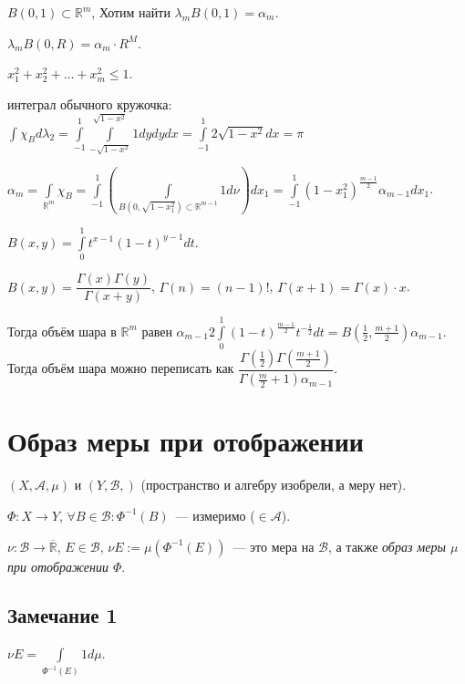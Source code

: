 \documentclass{article}
\begin{document}
        $B(0, 1) \subset \mathbb{R}^m$, Хотим найти $\lambda_m B(0, 1) = \alpha_m$.
    
        $\lambda_m B(0, R) = \alpha_m \cdot R^M$.
    
        $x_1^2 + x_2^2 + \ldots + x_m^2 \leqslant 1$.
    
        интеграл обычного кружочка: $\int \chi_B d \lambda_2 = \int\limits^1_{-1} \int\limits^{\sqrt{1 - x^2}}_{-\sqrt{1 - x^2}} 1 dy dy dx = \int\limits^1_{-1} 2 \sqrt{1 - x^2} dx = \pi$
    
        $\alpha_m = \int\limits_{\mathbb{R}^m} \chi_B = \int\limits^1_{-1} \left( \int\limits_{B(0, \sqrt{1 - x_1^2}) \subset \mathbb{R}^{m -1}} 1 d \nu \right) dx_1 = \int\limits^1_{-1} (1 - x_1^2)^{\frac{m - 1}{2}} \alpha_{m - 1} d x_1$.
    
        $B(x, y) = \int\limits^1_0 t^{x - 1} (1 - t)^{y - 1} dt$.
    
        $B(x, y) = \dfrac{\Gamma(x) \Gamma(y)}{\Gamma(x + y)}$, $\Gamma(n) = (n - 1)!$, $\Gamma(x + 1) = \Gamma(x) \cdot x$.
    
        Тогда объём шара в $\mathbb{R}^m$ равен $\alpha_{m - 1} 2 \int\limits^1_0 (1 - t)^{\frac{m - 1}{2}} t^{-\frac{1}{2}} dt = B(\frac{1}{2}, \frac{m + 1}{2}) \alpha_{m - 1}$. Тогда объём шара можно переписать как $\dfrac{\Gamma (\frac{1}{2}) \Gamma (\frac{m + 1}{2})}{\Gamma (\frac{m}{2} + 1) \alpha_{m - 1}}$.
    
\newpage

    \section{Образ меры при отображении}
    
        $(X, \mathcal{A}, \mu)$ и $(Y, \mathcal{B}, )$ (пространство и алгебру изобрели, а меру нет).
    
        $\Phi : X \rightarrow Y$, $\forall B \in \mathcal{B} : \Phi^{-1}(B)$~--- измеримо ($\in \mathcal{A}$).
    
        $\nu : \mathcal{B} \rightarrow \overline{\mathbb{R}}$, $E \in \mathcal{B}$, $\nu E := \mu(\Phi^{-1}(E))$~--- это мера на $\mathcal{B}$, а также \textit{образ меры $\mu$ при отображении $\Phi$}.

        \subsection{Замечание 1}
        
            $\nu E = \int\limits_{\Phi^{-1}(E)} 1 d \mu$.
            
\end{document}
